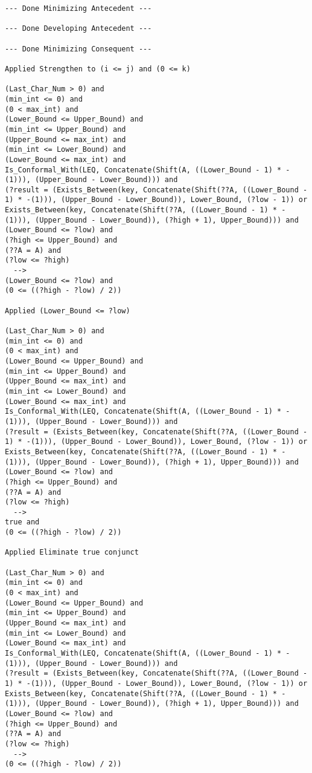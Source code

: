 \begin{lstlisting}[language=resolve]
--- Done Minimizing Antecedent ---

--- Done Developing Antecedent ---

--- Done Minimizing Consequent ---

Applied Strengthen to (i <= j) and (0 <= k)

(Last_Char_Num > 0) and
(min_int <= 0) and
(0 < max_int) and
(Lower_Bound <= Upper_Bound) and
(min_int <= Upper_Bound) and
(Upper_Bound <= max_int) and
(min_int <= Lower_Bound) and
(Lower_Bound <= max_int) and
Is_Conformal_With(LEQ, Concatenate(Shift(A, ((Lower_Bound - 1) * -(1))), (Upper_Bound - Lower_Bound))) and
(?result = (Exists_Between(key, Concatenate(Shift(??A, ((Lower_Bound - 1) * -(1))), (Upper_Bound - Lower_Bound)), Lower_Bound, (?low - 1)) or Exists_Between(key, Concatenate(Shift(??A, ((Lower_Bound - 1) * -(1))), (Upper_Bound - Lower_Bound)), (?high + 1), Upper_Bound))) and
(Lower_Bound <= ?low) and
(?high <= Upper_Bound) and
(??A = A) and
(?low <= ?high)
  -->
(Lower_Bound <= ?low) and
(0 <= ((?high - ?low) / 2))

Applied (Lower_Bound <= ?low)

(Last_Char_Num > 0) and
(min_int <= 0) and
(0 < max_int) and
(Lower_Bound <= Upper_Bound) and
(min_int <= Upper_Bound) and
(Upper_Bound <= max_int) and
(min_int <= Lower_Bound) and
(Lower_Bound <= max_int) and
Is_Conformal_With(LEQ, Concatenate(Shift(A, ((Lower_Bound - 1) * -(1))), (Upper_Bound - Lower_Bound))) and
(?result = (Exists_Between(key, Concatenate(Shift(??A, ((Lower_Bound - 1) * -(1))), (Upper_Bound - Lower_Bound)), Lower_Bound, (?low - 1)) or Exists_Between(key, Concatenate(Shift(??A, ((Lower_Bound - 1) * -(1))), (Upper_Bound - Lower_Bound)), (?high + 1), Upper_Bound))) and
(Lower_Bound <= ?low) and
(?high <= Upper_Bound) and
(??A = A) and
(?low <= ?high)
  -->
true and
(0 <= ((?high - ?low) / 2))

Applied Eliminate true conjunct

(Last_Char_Num > 0) and
(min_int <= 0) and
(0 < max_int) and
(Lower_Bound <= Upper_Bound) and
(min_int <= Upper_Bound) and
(Upper_Bound <= max_int) and
(min_int <= Lower_Bound) and
(Lower_Bound <= max_int) and
Is_Conformal_With(LEQ, Concatenate(Shift(A, ((Lower_Bound - 1) * -(1))), (Upper_Bound - Lower_Bound))) and
(?result = (Exists_Between(key, Concatenate(Shift(??A, ((Lower_Bound - 1) * -(1))), (Upper_Bound - Lower_Bound)), Lower_Bound, (?low - 1)) or Exists_Between(key, Concatenate(Shift(??A, ((Lower_Bound - 1) * -(1))), (Upper_Bound - Lower_Bound)), (?high + 1), Upper_Bound))) and
(Lower_Bound <= ?low) and
(?high <= Upper_Bound) and
(??A = A) and
(?low <= ?high)
  -->
(0 <= ((?high - ?low) / 2))


\end{lstlisting}
